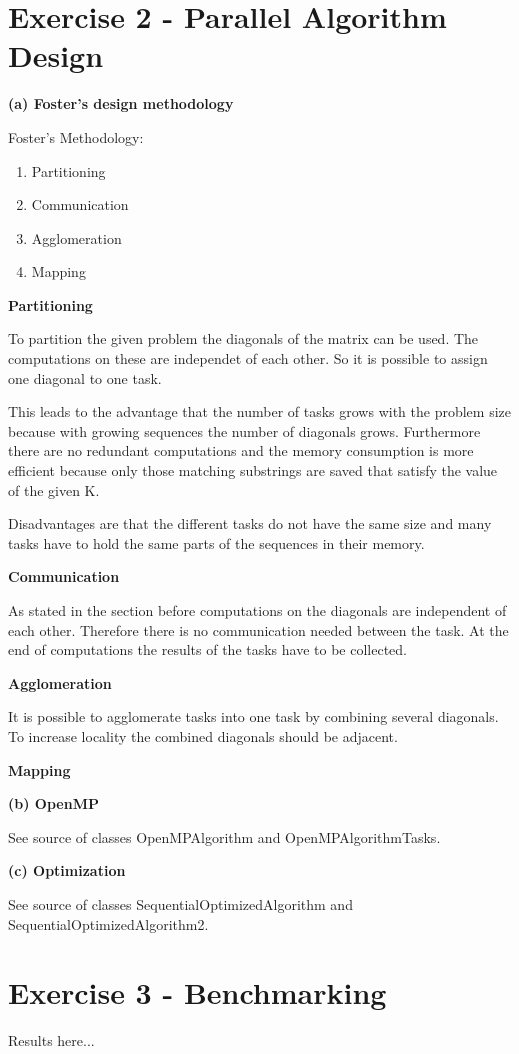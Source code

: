 \documentclass[a4paper,twoside,11pt]{article}
\begin{document}
\section{Exercise 2 - Parallel Algorithm Design}
\textbf{(a) Foster's design methodology}

Foster's Methodology:
\begin{enumerate}
	\item Partitioning
	\item Communication
	\item Agglomeration
	\item Mapping
\end{enumerate}

\textbf{Partitioning}

To partition the given problem the diagonals of the matrix can be used. The computations on these are independet of each other. So it is possible to assign one diagonal to one task. 

This leads to the advantage that the number of tasks grows with the problem size because with growing sequences the number of diagonals grows. Furthermore there are no redundant computations and the memory consumption is more efficient because only those matching substrings are saved that satisfy the value of the given K.

Disadvantages are that the different tasks do not have the same size and many tasks have to hold the same parts of the sequences in their memory.



\textbf{Communication}

As stated in the section before computations on the diagonals are independent of each other. Therefore there is no communication needed between the task. At the end of computations the results of the tasks have to be collected.

\textbf{Agglomeration}

It is possible to agglomerate tasks into one task by combining several diagonals. To increase locality the combined diagonals should be adjacent.

\textbf{Mapping}



\textbf{(b) OpenMP}

See source of classes OpenMPAlgorithm and OpenMPAlgorithmTasks.

\textbf{(c) Optimization}

See source of classes SequentialOptimizedAlgorithm and SequentialOptimizedAlgorithm2.

\section{Exercise 3 - Benchmarking}

Results here...
\end{document}
